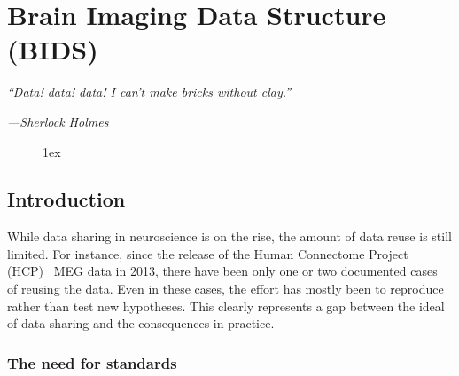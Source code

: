 \chapter{Brain Imaging Data Structure (BIDS)}
\label{chapter:group_study}

\epigraph{\small\itshape ``Data! data! data! I can't make bricks without clay.''}
{\small\textit{---Sherlock Holmes}}

\begin{figure}[ht!]
\centering
\begingroup
\etocstandardlines
\renewcommand{\etocbelowtocskip}{0pt\relax}
\fboxsep1ex
\localtableofcontents
\endgroup
\end{figure}

\clearpage

\section{Introduction}
While data sharing in neuroscience is on the rise, the amount of data reuse is still limited. For instance, since the release of the Human Connectome Project (HCP)~\citep{larson2013adding} MEG data in 2013, there have been only one or two documented cases~\citep{jas2017autoreject} of reusing the data. Even in these cases, the effort has mostly been to reproduce rather than test new hypotheses. This clearly represents a gap between the ideal of data sharing and the consequences in practice. 


\subsection{The need for standards}

